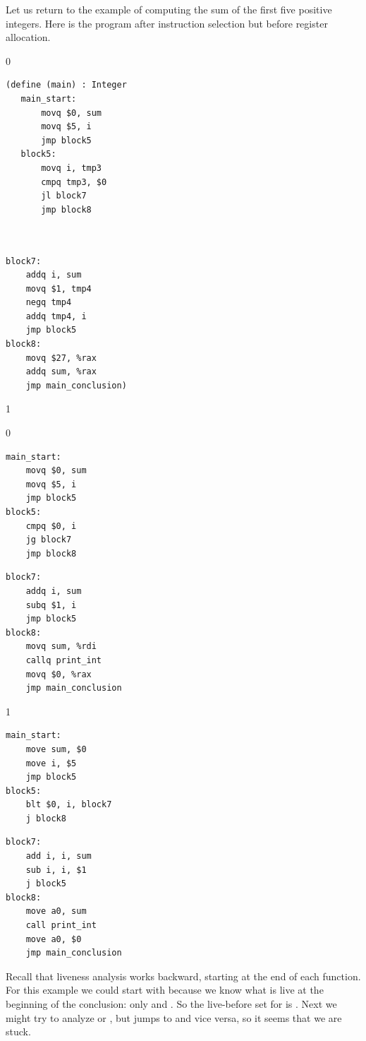 \documentclass[7x10]{TimesAPriori_MIT}%
\def\racketEd{0}
\def\pythonEd{1}
\def\edition{1}
\def\xeightysixEd{0}
\def\riscvEd{1}
\def\architecture{1}
\newcommand{\pythonColor}[0]{}
\numberwithin{theorem}{chapter}
\numberwithin{definition}{chapter}
\numberwithin{equation}{chapter}
\begin{document}
Let us return to the example of computing the sum of the first five
positive integers. Here is the program after instruction
selection but before register
allocation.
\begin{center}
{\if\edition\racketEd    
  \begin{minipage}{0.45\textwidth}
\begin{lstlisting}
(define (main) : Integer
   main_start:
       movq $0, sum
       movq $5, i
       jmp block5
   block5:
       movq i, tmp3
       cmpq tmp3, $0
       jl block7
       jmp block8
\end{lstlisting}
\end{minipage}
\begin{minipage}{0.45\textwidth}
  \begin{lstlisting}

    
block7:
    addq i, sum
    movq $1, tmp4
    negq tmp4
    addq tmp4, i
    jmp block5
block8:
    movq $27, %rax
    addq sum, %rax
    jmp main_conclusion)
\end{lstlisting}
  \end{minipage}
\fi}
{\if\edition\pythonEd\pythonColor
{\if\architecture\xeightysixEd
\begin{minipage}{0.45\textwidth}
\begin{lstlisting}
main_start:
    movq $0, sum
    movq $5, i
    jmp block5
block5:
    cmpq $0, i
    jg block7
    jmp block8
\end{lstlisting}
\end{minipage}
\begin{minipage}{0.45\textwidth}
\begin{lstlisting}
block7:
    addq i, sum
    subq $1, i
    jmp block5
block8:
    movq sum, %rdi
    callq print_int
    movq $0, %rax
    jmp main_conclusion
\end{lstlisting}
\end{minipage}
\fi}
{\if\architecture\riscvEd
\begin{minipage}{0.45\textwidth}
\begin{lstlisting}
main_start:
    move sum, $0
    move i, $5
    jmp block5
block5:
    blt $0, i, block7
    j block8
\end{lstlisting}
\end{minipage}
\begin{minipage}{0.45\textwidth}
\begin{lstlisting}
block7:
    add i, i, sum
    sub i, i, $1
    j block5
block8:
    move a0, sum
    call print_int
    move a0, $0
    jmp main_conclusion
\end{lstlisting}
\end{minipage}
\fi}
\fi}
\end{center}
Recall that liveness analysis works backward, starting at the end
of each function. For this example we could start with 
because we know what is live at the beginning of the conclusion:
only \RAX{} and \SP{}. So the live-before set
for  is .
%
Next we might try to analyze  or , but
 jumps to  and vice versa, so it seems that
we are stuck.
\end{document}

